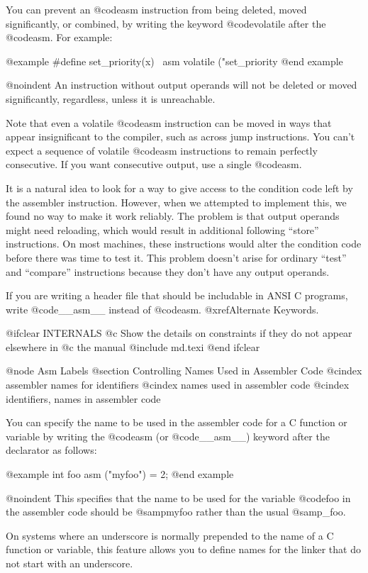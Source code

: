 {{{You can prevent an @code{asm} instruction from being deleted, moved
significantly, or combined, by writing the keyword @code{volatile} after
the @code{asm}.  For example:

@example
#define set_priority(x)  \
asm volatile ("set_priority %
@end example

@noindent
An instruction without output operands will not be deleted or moved
significantly, regardless, unless it is unreachable.

Note that even a volatile @code{asm} instruction can be moved in ways
that appear insignificant to the compiler, such as across jump
instructions.  You can't expect a sequence of volatile @code{asm}
instructions to remain perfectly consecutive.  If you want consecutive
output, use a single @code{asm}.

It is a natural idea to look for a way to give access to the condition
code left by the assembler instruction.  However, when we attempted to
implement this, we found no way to make it work reliably.  The problem
is that output operands might need reloading, which would result in
additional following ``store'' instructions.  On most machines, these
instructions would alter the condition code before there was time to
test it.  This problem doesn't arise for ordinary ``test'' and
``compare'' instructions because they don't have any output operands.

If you are writing a header file that should be includable in ANSI C
programs, write @code{__asm__} instead of @code{asm}.  @xref{Alternate
Keywords}.

@ifclear INTERNALS
@c Show the details on constraints if they do not appear elsewhere in
@c the manual
@include md.texi
@end ifclear

@node Asm Labels
@section Controlling Names Used in Assembler Code
@cindex assembler names for identifiers
@cindex names used in assembler code
@cindex identifiers, names in assembler code

You can specify the name to be used in the assembler code for a C
function or variable by writing the @code{asm} (or @code{__asm__})
keyword after the declarator as follows:

@example
int foo asm ("myfoo") = 2;
@end example

@noindent
This specifies that the name to be used for the variable @code{foo} in
the assembler code should be @samp{myfoo} rather than the usual
@samp{_foo}.

On systems where an underscore is normally prepended to the name of a C
function or variable, this feature allows you to define names for the
linker that do not start with an underscore.

}}}
